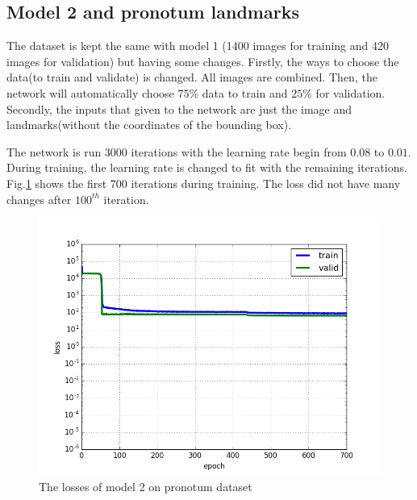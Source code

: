 \subsection{Model 2 and pronotum landmarks}
The dataset is kept the same with model 1 (1400 images for training and 420 images for validation) but having some changes. Firstly, the ways to choose the data(to train and validate) is changed. All images are combined. Then, the network will automatically choose $75 \%$ data to train and $25 \%$ for validation. Secondly, the inputs that given to the network are just the image and landmarks(without the coordinates of the bounding box).

The network is run 3000 iterations with the learning rate begin from $0.08$ to $0.01$. During training, the learning rate is changed to fit with the remaining iterations\cite{lecun2012efficient}. Fig.\ref{model2pl} shows the first 700 iterations during training. The loss did not have many changes after $100^{th}$ iteration.

\begin{figure}[h!]
	\centering
	\includegraphics[scale=0.4]{images/figure_1_loss_celia}
	\caption{The losses of model 2 on pronotum dataset}
	\label{model2pl}
\end{figure}

